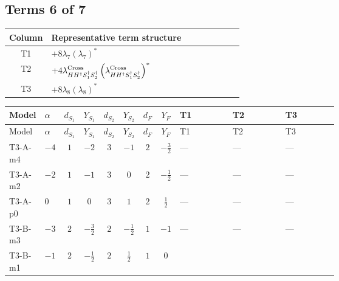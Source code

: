 \documentclass[8pt]{article}
\begin{document}
\begin{landscape}
\subsection*{Terms 6 of 7}
\begin{center}
\begin{tabular}{@{}c >{\raggedright\arraybackslash}p{0.82\linewidth}@{}}
\toprule
Column & Representative term structure \\
\midrule
T1 & \(\displaystyle +8 {\lambda_{7}} \left({\lambda_{7}}\right)^{*}\) \\
\midrule
T2 & \(\displaystyle +4 {\lambda_{H H^\dagger S_1^\dagger S_2^\dagger}^{\rm Cross}} \left({\lambda_{H H^\dagger S_1^\dagger S_2^\dagger}^{\rm Cross}}\right)^{*}\) \\
\midrule
T3 & \(\displaystyle +8 {\lambda_{8}} \left({\lambda_{8}}\right)^{*}\) \\
\midrule
\bottomrule
\end{tabular}
\end{center}
\smallskip
\tiny
\begin{longtable}{@{}llcccccc >{\raggedright\arraybackslash}p{0.21\linewidth} >{\raggedright\arraybackslash}p{0.21\linewidth} >{\raggedright\arraybackslash}p{0.21\linewidth}@{}}
\toprule
Model & $\alpha$ & $d_{S_1}$ & $Y_{S_1}$ & $d_{S_2}$ & $Y_{S_2}$ & $d_F$ & $Y_F$ & T1 & T2 & T3 \\
\midrule
\endfirsthead
\toprule
Model & $\alpha$ & $d_{S_1}$ & $Y_{S_1}$ & $d_{S_2}$ & $Y_{S_2}$ & $d_F$ & $Y_F$ & T1 & T2 & T3 \\
\midrule
\endhead
T3-A-m4 & $-4$ & $1$ & $-2$ & $3$ & $-1$ & $2$ & $-\frac{3}{2}$ & --- & --- & --- \\
\midrule
T3-A-m2 & $-2$ & $1$ & $-1$ & $3$ & $0$ & $2$ & $-\frac{1}{2}$ & --- & --- & --- \\
\midrule
T3-A-p0 & $0$ & $1$ & $0$ & $3$ & $1$ & $2$ & $\frac{1}{2}$ & --- & --- & --- \\
\midrule
T3-B-m3 & $-3$ & $2$ & $-\frac{3}{2}$ & $2$ & $-\frac{1}{2}$ & $1$ & $-1$ & --- & --- & --- \\
\midrule
T3-B-m1 & $-1$ & $2$ & $-\frac{1}{2}$ & $2$ & $\frac{1}{2}$ & $1$ & $0$ & \scriptsize\adjustbox{max width=\linewidth}{$\begin{gathered} +8 {\lambda_{7}} \left({\lambda_{7}}\right)^{*}\end{gathered}$} & \scriptsize\adjustbox{max width=\linewidth}{$\begin{gathered} +4 {\lambda_{H H^\dagger S_1^\dagger S_2^\dagger}^{\rm Cross}} \left({\lambda_{H H^\dagger S_1^\dagger S_2^\dagger}^{\rm Cross}}\right)^{*}\end{gathered}$} & \scriptsize\adjustbox{max width=\linewidth}{$\begin{gathered} +8 {\lambda_{8}} \left({\lambda_{8}}\right)^{*}\end{gathered}$} \\

\end{longtable}
\end{landscape}
\end{document}
